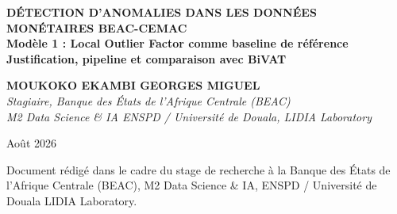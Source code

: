 \documentclass[12pt,a4paper]{article}
\begin{document}
\begin{titlepage}
\centering
\vspace*{2cm}

{\LARGE\bfseries
DÉTECTION D'ANOMALIES DANS LES DONNÉES MONÉTAIRES BEAC-CEMAC\\[0.4em]
\large\normalfont
Modèle 1 : Local Outlier Factor comme baseline de référence 
Justification, pipeline et comparaison avec BiVAT\\[0.4em]
}

\vspace{2cm}

{\large\bfseries MOUKOKO EKAMBI GEORGES MIGUEL}\\[0.5em]
{\normalsize\itshape
Stagiaire, Banque des États de l'Afrique Centrale (BEAC)\\
M2 Data Science \& IA  ENSPD / Université de Douala, LIDIA Laboratory
}

\vspace{2cm}

{\normalsize Août 2026}

\vfill

{\small
Document rédigé dans le cadre du stage de recherche à la Banque des États
de l'Afrique Centrale (BEAC), M2 Data Science \& IA,
ENSPD / Université de Douala  LIDIA Laboratory.
}
\end{titlepage}

\begin{abstract}
Ce document présente la méthodologie complète du Modèle~1 d'une étude
comparative à deux niveaux portant sur la détection non supervisée de
variations atypiques dans les données monétaires des Autres Sociétés de
Dépôts (2SR) de la zone CEMAC. Le Modèle~1 est le Local Outlier Factor
(LOF), retenu comme baseline de référence parmi huit méthodes concurrentes
sur la base de critères empiriques documentés. Trois contributions structurent
ce document. Premièrement, une justification empirique du choix du LOF parmi
les méthodes de détection d'anomalies classiques, appuyée sur des benchmarks
publiés et cinq publications institutionnelles BIS/BCE/Banca d'Italia.
Deuxièmement, la documentation des cinq lacunes structurelles du LOF 
ignorance des dépendances temporelles, dégénérescence en haute dimension,
absence de quantification d'incertitude, inexplicabilité par indicateur, et
instabilité des scores  qui motivent le passage au Modèle~2 (BiVAT).
Troisièmement, un protocole de comparaison entre les deux modèles sans labels
ground truth, fondé sur des métriques d'évaluation non supervisée adaptées au
contexte de surveillance macroprudentielle BEAC-CEMAC.

\bigskip
\noindent\textbf{Mots-clés :} détection d'anomalies non supervisée, Local
Outlier Factor, densité locale, séries temporelles financières, BEAC, CEMAC,
pipeline de prétraitement, baseline comparative, BiVAT.
\end{abstract}
\end{document}
